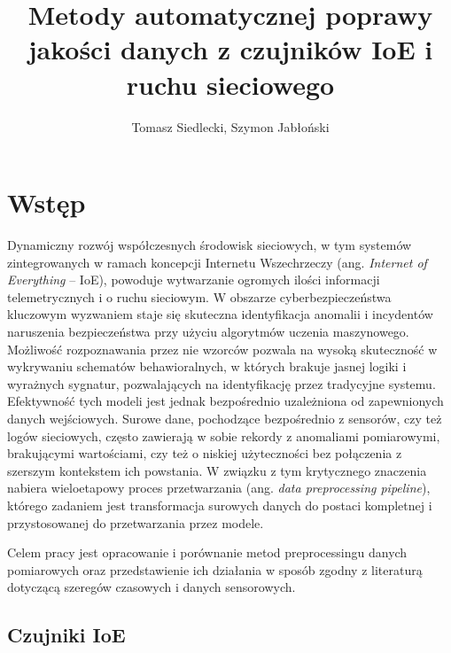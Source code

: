 \documentclass[12pt,twoside]{article}
\author{Tomasz Siedlecki, Szymon Jabłoński}
\title{Metody automatycznej poprawy jakości danych z czujników IoE i ruchu sieciowego}
\begin{document}
\maketitle

\blankpage

\tableofcontents

\clearpage
\blankpage

\section{Wstęp}

Dynamiczny rozwój współczesnych środowisk sieciowych, w tym systemów zintegrowanych w ramach koncepcji Internetu Wszechrzeczy (ang. \emph{Internet of Everything} -- IoE), powoduje wytwarzanie ogromych ilości informacji telemetrycznych i o ruchu sieciowym. 
W obszarze cyberbezpieczeństwa kluczowym wyzwaniem staje się skuteczna identyfikacja anomalii i incydentów naruszenia bezpieczeństwa przy użyciu algorytmów uczenia maszynowego.
Możliwość rozpoznawania przez nie wzorców pozwala na wysoką skuteczność w wykrywaniu schematów behawioralnych, w których brakuje jasnej logiki i wyrażnych sygnatur, pozwalających na identyfikację przez tradycyjne systemu.
Efektywność tych modeli jest jednak bezpośrednio uzależniona od zapewnionych danych wejściowych. 
Surowe dane, pochodzące bezpośrednio z sensorów, czy też logów sieciowych, często zawierają w sobie rekordy z anomaliami pomiarowymi, brakującymi wartościami, czy też o niskiej użyteczności bez połączenia z szerszym kontekstem ich powstania.
W związku z tym krytycznego znaczenia nabiera wieloetapowy proces przetwarzania (ang. \emph{data preprocessing pipeline}), którego zadaniem jest transformacja surowych danych do postaci kompletnej i przystosowanej do przetwarzania przez modele.

Celem pracy jest opracowanie i porównanie metod preprocessingu danych pomiarowych oraz przedstawienie ich działania w sposób zgodny z literaturą dotyczącą szeregów czasowych i danych sensorowych.

\subsection{Czujniki IoE}
\end{document}
